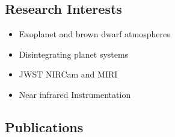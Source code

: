 \documentclass[11pt, oneside]{article}   	%
\begin{document}
\vspace{-0.2in}

\subsection*{Research Interests}
\begin{itemize}[noitemsep]
	\item Exoplanet and brown dwarf atmospheres
	\item Disintegrating planet systems
	\item JWST NIRCam and MIRI
	\item Near infrared Instrumentation
\end{itemize}
\vspace{-0.2in}

\subsection*{Publications}
\nocite{schlawin2018kic1255Normal}
\nocite{schlawin2018JWSTforecasts}
\nocite{schlawin2014}
\nocite{schlawin2017dhs}
\nocite{schlawin2017bdVar}
\nocite{greene2017jatisNIRCam}
\nocite{greene2016slitlessGrisms}
\nocite{schlawin2016kic1255}
\nocite{santerne2016ogle2011BLG-0417}
\nocite{stevenson2016ers}
\nocite{schlawin2010}
\nocite{schlawin2016kic1255}
\nocite{schlawin2014TSpec}
\nocite{muirheadKOI961}
\nocite{dale2009spitzerAnthology}
\nocite{west2011sloanMdwarf}
\nocite{muirhead2012}
\nocite{johnson2012}
\nocite{muirheadKOI961}
\nocite{muirhead2014coolKOIIV}

\begingroup
\renewcommand{\section}[2]{}%


\endgroup

%
%
\end{document}
